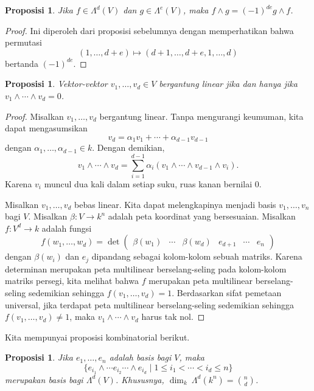 \documentclass[12pt]{article}
\theoremstyle{plain}
\newtheorem{proposition}[theorem]{Proposisi}
\theoremstyle{definition}
\theoremstyle{remark}
\numberwithin{equation}{section}
\begin{document}
\begin{proposition}
Jika $f \in \Lambda^d(V)$ dan $g \in \Lambda^e(V)$,
maka $f \wedge g = (-1)^{de} g \wedge f$.
\end{proposition}

\begin{proof}
Ini diperoleh dari proposisi sebelumnya dengan memperhatikan bahwa
permutasi
\[
(1,\ldots,d+e) \mapsto (d+1,\ldots,d+e,1,\ldots,d)
\]
bertanda $(-1)^{de}$.
\end{proof}

\begin{proposition}
Vektor-vektor $v_1,\ldots , v_d \in V$ bergantung linear
jika dan hanya jika $v_1 \wedge \cdots \wedge v_d=0$.
\end{proposition}

\begin{proof}
Misalkan $v_1,\ldots, v_d$ bergantung linear.
Tanpa mengurangi keumuman, kita dapat mengasumsikan
\[
v_d = \alpha_1 v_1 + \cdots + \alpha_{d-1} v_{d-1}
\]
dengan $\alpha_1, \ldots, \alpha_{d-1} \in k$.
Dengan demikian,
\[
v_1 \wedge \cdots \wedge v_d =
\sum_{i=1}^{d-1} \alpha_i(v_1 \wedge \cdots \wedge v_{d-1} \wedge v_i).
\]
Karena $v_i$ muncul dua kali dalam setiap suku, ruas kanan bernilai $0$.

Misalkan $v_1,\ldots, v_d$ bebas linear.
Kita dapat melengkapinya menjadi basis $v_1,\ldots,v_n$ bagi $V$.
Misalkan $\beta : V \to k^n$ adalah peta koordinat yang bersesuaian.
Misalkan $f : V^d \to k$ adalah fungsi
\[
f(w_1,\ldots,w_d) = \det
\begin{pmatrix} \beta(w_1) & \cdots & \beta(w_d)
& e_{d+1} & \cdots & e_n
\end{pmatrix}
\]
dengan $\beta(w_i)$ dan $e_j$ dipandang sebagai kolom-kolom sebuah matriks.
Karena determinan merupakan peta multilinear berselang-seling pada kolom-kolom
matriks persegi, kita melihat bahwa $f$ merupakan peta multilinear berselang-seling
sedemikian sehingga $f(v_1,\ldots,v_d)=1$.
Berdasarkan sifat pemetaan universal, jika terdapat peta multilinear
berselang-seling sedemikian sehingga $f(v_1,\ldots,v_d) \ne 1$,
maka $v_1 \wedge \cdots \wedge v_d$ harus tak nol.
\end{proof}

Kita mempunyai proposisi kombinatorial berikut.

\begin{proposition}
Jika $e_1, \ldots, e_n$ adalah basis bagi $V$, maka
\[
\{
e_{i_1} \wedge \cdots e_{i_2} \cdots \wedge e_{i_d}
\mid
1 \le i_1 < \cdots < i_d \le n
\}
\]
merupakan basis bagi $\Lambda^d(V)$.
Khususnya, $\dim_k\ \Lambda^d(k^n)=\binom{n}{d}$.
\end{proposition}
\end{document}
